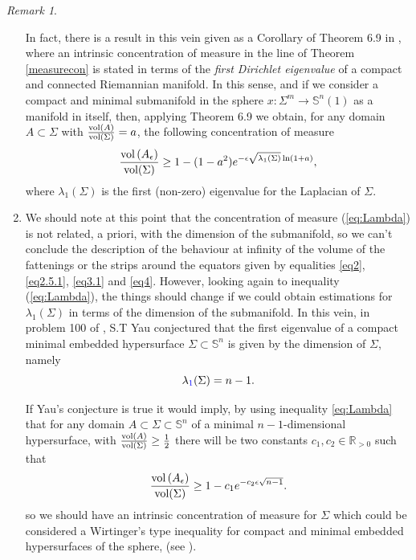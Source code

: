 \documentclass{amsart}
\theoremstyle{definition}
\theoremstyle{remark}
\newtheorem{remark}[theorem]{Remark}
\newcommand{\ese}{\mathbb{S}}
\providecommand{\DIFadd}[1]{{\protect\color{blue}\uwave{#1}}} %
\providecommand{\DIFaddbegin}{} %
\providecommand{\DIFaddend}{} %
\begin{document}
\begin{remark}
\begin{enumerate}
In fact, there is a result in this vein given as a Corollary of Theorem 6.9 in \cite{MS}, where an intrinsic concentration of measure in the line of Theorem \ref{measurecon} is stated in terms of the {\em first Dirichlet eigenvalue} of a compact and connected Riemannian manifold. In this sense, and if we consider a compact and minimal submanifold in the sphere $x:\Sigma^m \rightarrow \ese^n(1)$ as a manifold in itself, then, applying Theorem 6.9 we obtain, for any domain $A\subset \Sigma$ with $\frac{{\rm vol}(A)}{{\rm vol}( \Sigma)}=a$, the following concentration of measure
\begin{equation}\label{eq:Lambda}
   \frac{{\rm vol}\left(A_\epsilon\right)}{{\rm vol}( \Sigma)}\geq 1-(1-a^2)e^{-\epsilon\sqrt{\lambda_1(\Sigma)}\ln(1+a)}, 
\end{equation}
\noindent where $\lambda_1(\Sigma)$ is the first (non-zero) eigenvalue for the Laplacian of $\Sigma$.  
\medskip

\item We should note at this point that the concentration of measure (\ref{eq:Lambda}) is not related, a priori, with the dimension of the submanifold, so we can't conclude the description of the behaviour at infinity of the volume of the fattenings or the strips around the equators given by equalities \eqref{eq2}, \eqref{eq2.5.1}, \eqref{eq3.1} and \eqref{eq4}. However, looking again to inequality (\ref{eq:Lambda}), the things should change if we could obtain estimations for $\lambda_1(\Sigma)$ in terms of the dimension of the submanifold. In this vein, in problem 100 of \cite{YauMR0645728}, S.T Yau conjectured that the first eigenvalue of a compact minimal embedded hypersurface $\Sigma\subset \mathbb{S}^{n}$ is given by the dimension of $\Sigma$, namely
$$\lambda\DIFaddbegin \DIFadd{_1}\DIFaddend (\Sigma)=n-1.$$
If  Yau's conjecture is true it would  imply, by using inequality \eqref{eq:Lambda} that for any domain $A\subset \Sigma\subset \mathbb{S}^{n}$  of a minimal $n-1$-dimensional hypersurface, with 
 $\frac{{\rm vol}(A)}{{\rm vol}( \Sigma)}\geq \frac{1}{2}$ there will be two constants $c_1,c_2\in \mathbb{R}_{>0}$ such that
 \begin{equation}\label{eq:yau1}
   \frac{{\rm vol}\left(A_\epsilon\right)}{{\rm vol}( \Sigma)}\geq 1-c_1e^{-c_2\epsilon\sqrt{n-1}}. 
\end{equation}
\noindent so we should have an intrinsic concentration of measure for $\Sigma$ which could be considered a Wirtinger's type inequality for compact and minimal embedded hypersurfaces of the sphere, (see \cite{Gromov}).


\end{enumerate}
\end{remark}
\end{document}
